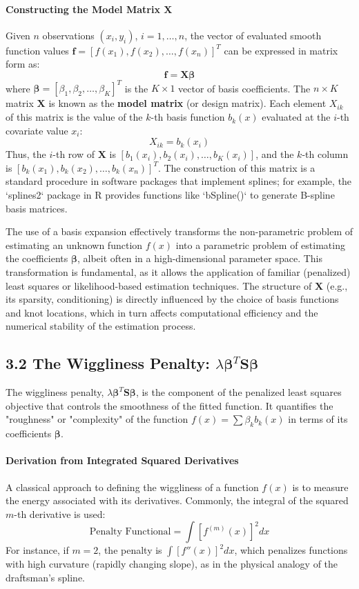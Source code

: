 \documentclass[11pt, a4paper]{article}
\begin{document}
\paragraph{Constructing the Model Matrix $\mathbf{X}$}
Given $n$ observations $(x_i, y_i)$, $i=1, \dots, n$, the vector of evaluated smooth function values $\mathbf{f} = [f(x_1), f(x_2), \dots, f(x_n)]^T$ can be expressed in matrix form as:
\[ \mathbf{f} = \mathbf{X}\boldsymbol{\beta} \]
where $\boldsymbol{\beta} = [\beta_1, \beta_2, \dots, \beta_K]^T$ is the $K \times 1$ vector of basis coefficients. The $n \times K$ matrix $\mathbf{X}$ is known as the \textbf{model matrix} (or design matrix). Each element $X_{ik}$ of this matrix is the value of the $k$-th basis function $b_k(x)$ evaluated at the $i$-th covariate value $x_i$:
\[ X_{ik} = b_k(x_i) \]
Thus, the $i$-th row of $\mathbf{X}$ is $[b_1(x_i), b_2(x_i), \dots, b_K(x_i)]$, and the $k$-th column is $[b_k(x_1), b_k(x_2), \dots, b_k(x_n)]^T$. The construction of this matrix is a standard procedure in software packages that implement splines; for example, the `splines2` package in R provides functions like `bSpline()` to generate B-spline basis matrices.

The use of a basis expansion effectively transforms the non-parametric problem of estimating an unknown function $f(x)$ into a parametric problem of estimating the coefficients $\boldsymbol{\beta}$, albeit often in a high-dimensional parameter space. This transformation is fundamental, as it allows the application of familiar (penalized) least squares or likelihood-based estimation techniques. The structure of $\mathbf{X}$ (e.g., its sparsity, conditioning) is directly influenced by the choice of basis functions and knot locations, which in turn affects computational efficiency and the numerical stability of the estimation process.

\subsection{3.2 The Wiggliness Penalty: $\lambda \boldsymbol{\beta}^T \mathbf{S} \boldsymbol{\beta}$}
The wiggliness penalty, $\lambda \boldsymbol{\beta}^T \mathbf{S} \boldsymbol{\beta}$, is the component of the penalized least squares objective that controls the smoothness of the fitted function. It quantifies the "roughness" or "complexity" of the function $f(x) = \sum \beta_k b_k(x)$ in terms of its coefficients $\boldsymbol{\beta}$.

\paragraph{Derivation from Integrated Squared Derivatives}
A classical approach to defining the wiggliness of a function $f(x)$ is to measure the energy associated with its derivatives. Commonly, the integral of the squared $m$-th derivative is used:
\[ \text{Penalty Functional} = \int [f^{(m)}(x)]^2 dx \]
For instance, if $m=2$, the penalty is $\int [f''(x)]^2 dx$, which penalizes functions with high curvature (rapidly changing slope), as in the physical analogy of the draftsman's spline.
\end{document}
